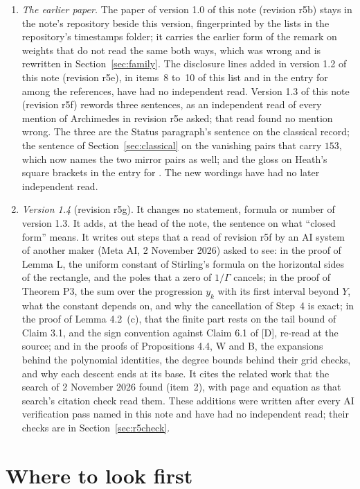 \documentclass[11pt]{article}
\begin{document}
\begin{enumerate}
\item \emph{The earlier paper.} The paper of version 1.0 of this note (revision r5b) stays in the note's repository beside this version, fingerprinted by the lists in the repository's timestamps folder; it carries the earlier form of the remark on weights that do not read the same both ways, which was wrong and is rewritten in Section~\ref{sec:family}. The disclosure lines added in version 1.2 of this note (revision r5e), in items~8 to~10 of this list and in the entry for \cite{UN} among the references, have had no independent read. Version 1.3 of this note (revision r5f) rewords three sentences, as an independent read of every mention of Archimedes in revision r5e asked; that read found no mention wrong. The three are the Status paragraph's sentence on the classical record; the sentence of Section~\ref{sec:classical} on the vanishing pairs that carry $153$, which now names the two mirror pairs as well; and the gloss on Heath's square brackets in the entry for \cite{Ar}. The new wordings have had no later independent read.
\item \emph{Version 1.4} (revision r5g). It changes no statement, formula or number of version 1.3. It adds, at the head of the note, the sentence on what ``closed form'' means. It writes out steps that a read of revision r5f by an AI system of another maker (Meta AI, 2 November 2026) asked to see: in the proof of Lemma L, the uniform constant of Stirling's formula on the horizontal sides of the rectangle, and the poles that a zero of $1/\Gamma$ cancels; in the proof of Theorem P3, the sum over the progression $y_k$ with its first interval beyond $Y$, what the constant depends on, and why the cancellation of Step~4 is exact; in the proof of Lemma 4.2~(c), that the finite part rests on the tail bound of Claim 3.1, and the sign convention against Claim 6.1 of [D], re-read at the source; and in the proofs of Propositions 4.4, W and B, the expansions behind the polynomial identities, the degree bounds behind their grid checks, and why each descent ends at its base. It cites the related work that the search of 2 November 2026 found (item~2), with page and equation as that search's citation check read them. These additions were written after every AI verification pass named in this note and have had no independent read; their checks are in Section~\ref{sec:r5check}.
\end{enumerate}

\section{Where to look first}\label{sec:look}
\end{document}
